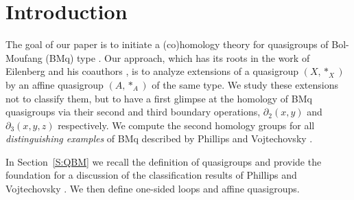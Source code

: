 \documentclass[11pt]{amsart}
\theoremstyle{definition}
\begin{document}
\section{Introduction}




The goal of our paper is to  initiate a (co)homology theory for quasigroups of Bol-Moufang (BMq) type \cite{Bo,Mo,PhVo1}. Our approach, which has its roots in the work of Eilenberg and his coauthors \cite{Eil,EM,CE}, is to analyze extensions of a quasigroup $(X,*_X)$ by an affine quasigroup $(A,*_A)$ of the same type. We study these extensions not to classify them, but to have a first glimpse at the homology of BMq quasigroups via their second and third boundary operations, $\partial_2(x,y)$ and $\partial_3(x,y,z)$ respectively. We compute the second homology groups for all \emph{distinguishing examples} of BMq described by Phillips and Vojtechovsky \cite{PhVo1}.
 

In Section~\ref{S:QBM} we recall the definition of quasigroups and provide the foundation for a discussion of the classification results of Phillips and Vojtechovsky \cite{PhVo1}. We then define one-sided loops and affine quasigroups.
\color{black}
\end{document}
